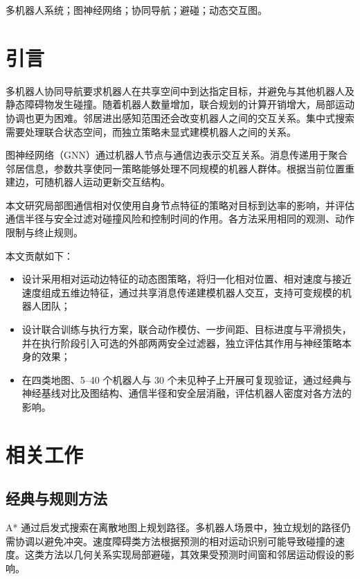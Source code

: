 \documentclass[conference]{IEEEtran}
\begin{document}
\begin{IEEEkeywords}
多机器人系统；图神经网络；协同导航；避碰；动态交互图。
\end{IEEEkeywords}

\section{引言}

多机器人协同导航要求机器人在共享空间中到达指定目标，并避免与其他机器人及静态障碍物发生碰撞。随着机器人数量增加，联合规划的计算开销增大，局部运动协调也更为困难。邻居进出感知范围还会改变机器人之间的交互关系。集中式搜索需要处理联合状态空间，而独立策略未显式建模机器人之间的关系。

图神经网络（GNN）通过机器人节点与通信边表示交互关系。消息传递用于聚合邻居信息，参数共享使同一策略能够处理不同规模的机器人群体。根据当前位置重建边，可随机器人运动更新交互结构。

本文研究局部图通信相对仅使用自身节点特征的策略对目标到达率的影响，并评估通信半径与安全过滤对碰撞风险和控制时间的作用。各方法采用相同的观测、动作限制与终止规则。

本文贡献如下：
\begin{itemize}
  \item 设计采用相对运动边特征的动态图策略，将归一化相对位置、相对速度与接近速度组成五维边特征，通过共享消息传递建模机器人交互，支持可变规模的机器人团队；
  \item 设计联合训练与执行方案，联合动作模仿、一步间距、目标进度与平滑损失，并在执行阶段引入可选的外部两两安全过滤器，独立评估其作用与神经策略本身的效果；
  \item 在四类地图、5--40 个机器人与 30 个未见种子上开展可复现验证，通过经典与神经基线对比及图结构、通信半径和安全层消融，评估机器人密度对各方法的影响。
\end{itemize}

\section{相关工作}

\subsection{经典与规则方法}
A* 通过启发式搜索在离散地图上规划路径\cite{hart1968}。多机器人场景中，独立规划的路径仍需协调以避免冲突。速度障碍类方法根据预测的相对运动识别可能导致碰撞的速度\cite{fiorini1998}。这类方法以几何关系实现局部避碰，其效果受预测时间窗和邻居运动假设的影响。
\end{document}
